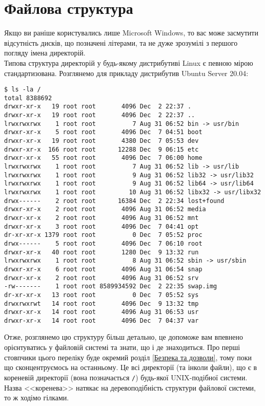 \documentclass[10pt,a4paper]{fancyhandout}
\begin{document}
\section{Файлова структура}
Якщо ви раніше користувались лише Microsoft Windows, то вас може засмутити відсутність дисків, що позначені літерами, та не дуже зрозумілі з першого погляду імена директорій. \\ 
Типова структура директорій у будь-якому дистрибутиві Linux є певною мірою стандартизована. Розглянемо для прикладу дистрибутив Ubuntu Server 20.04:\\
\begin{verbatim}
$ ls -la /
total 8388692
drwxr-xr-x   19 root root       4096 Dec  2 22:37 .
drwxr-xr-x   19 root root       4096 Dec  2 22:37 ..
lrwxrwxrwx    1 root root          7 Aug 31 06:52 bin -> usr/bin
drwxr-xr-x    5 root root       4096 Dec  7 04:51 boot
drwxr-xr-x   19 root root       4380 Dec  7 05:53 dev
drwxr-xr-x  166 root root      12288 Dec  9 06:15 etc
drwxr-xr-x   55 root root       4096 Dec  7 06:00 home
lrwxrwxrwx    1 root root          7 Aug 31 06:52 lib -> usr/lib
lrwxrwxrwx    1 root root          9 Aug 31 06:52 lib32 -> usr/lib32
lrwxrwxrwx    1 root root          9 Aug 31 06:52 lib64 -> usr/lib64
lrwxrwxrwx    1 root root         10 Aug 31 06:52 libx32 -> usr/libx32
drwx------    2 root root      16384 Dec  2 22:34 lost+found
drwxr-xr-x    2 root root       4096 Aug 31 06:52 media
drwxr-xr-x    2 root root       4096 Aug 31 06:52 mnt
drwxr-xr-x    3 root root       4096 Dec  7 04:41 opt
dr-xr-xr-x 1379 root root          0 Dec  7 05:52 proc
drwx------    5 root root       4096 Dec  7 06:10 root
drwxr-xr-x   40 root root       1280 Dec  9 13:32 run
lrwxrwxrwx    1 root root          8 Aug 31 06:52 sbin -> usr/sbin
drwxr-xr-x    6 root root       4096 Aug 31 06:54 snap
drwxr-xr-x    2 root root       4096 Aug 31 06:52 srv
-rw-------    1 root root 8589934592 Dec  2 22:35 swap.img
dr-xr-xr-x   13 root root          0 Dec  7 05:52 sys
drwxrwxrwt   14 root root       4096 Dec  9 13:32 tmp
drwxr-xr-x   14 root root       4096 Aug 31 06:53 usr
drwxr-xr-x   14 root root       4096 Dec  7 04:37 var
\end{verbatim}
Отже, розглянемо цю структуру більш детально, це допоможе вам впевнено орієнтуватись у файловій системі та знати, що і де знаходиться. Про перші стовпчики цього переліку буде окремий розділ \ref{Безпека та дозволи}, тому поки що сконцентруємось на останньому. Це всі директорії (та інколи файли), що є в кореневій директорії (вона позначається \texttt{/}) будь-якої UNIX-подібної системи. Назва <<коренева>> натякає на деревоподібність структури файлової системи, то ж ходімо гілками.
\end{document}
